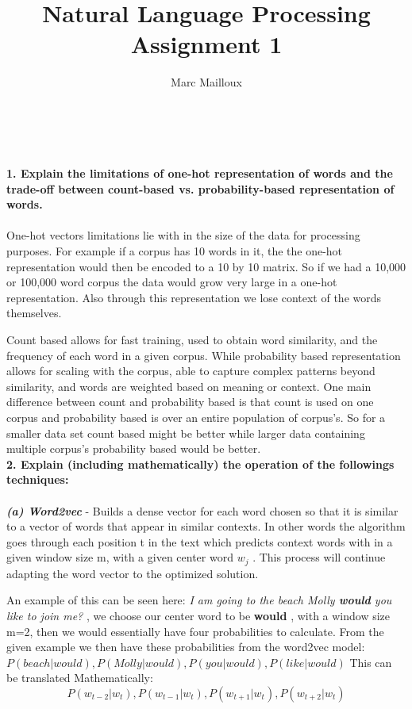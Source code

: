 \documentclass[12pt,a4paper]{report}
\author{Marc Mailloux}
\title{Natural Language Processing Assignment 1}
\begin{document}
\\\\
\textbf{
1. Explain the limitations of one-hot representation of words and the trade-off between count-based vs. probability-based representation of words.
}
\\\\
One-hot vectors limitations lie with in the size of the data for processing purposes. For example if a corpus has 10 words in it, the the one-hot representation would then be encoded to a 10 by 10 matrix. So if we had a 10,000 or 100,000 word corpus the data would grow very large in a one-hot representation. Also through this representation we lose context of the words themselves. 

Count based allows for fast training, used to obtain word similarity, and the frequency of each word in a given corpus. While probability based representation allows for scaling with the corpus, able to capture complex patterns beyond similarity, and words are weighted based on meaning or context. One main difference between count and probability based is that count is used on one corpus and probability based is over an entire population of corpus's. So for a smaller data set count based might be better while larger data containing multiple corpus's probability based would be better. 
\\

\textbf{
2. Explain (including mathematically) the operation of the followings techniques: }
\\\\
\textbf{\textsl{(a) Word2vec}} - 
Builds a dense vector for each word chosen so that it is similar to a vector of words that appear in similar contexts. In other words the algorithm goes through each position t in the text which predicts context words with in a given window size m, with a given center word $w_{j}$ . This process will continue adapting the word vector to the optimized solution. 

An example of this can be seen here: \emph{ I am going to the beach Molly \textbf{would} you like to join me?} , we choose our center word to be \textbf{would} , with a window size m=2, then we would essentially have four probabilities to calculate. From the given example we then have these probabilities from the word2vec model: $ P( beach | would) , P(Molly | would), P(you | would), P(like | would)$
This can be translated Mathematically:
$$ P(w_{t-2} | w_{t}) ,P(w_{t-1} | w_{t}), P(w_{t+1} | w_{t}), P(w_{t+2} | w_{t}) $$ 
\end{document}
